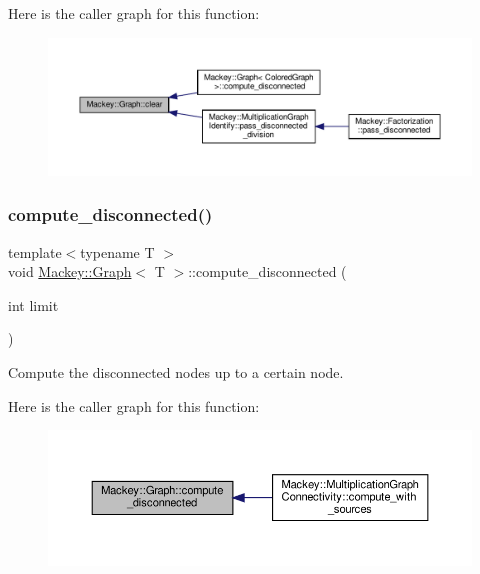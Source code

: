Here is the caller graph for this function\+:\nopagebreak
\begin{figure}[H]
\begin{center}
\leavevmode
\includegraphics[width=350pt]{classMackey_1_1Graph_a69d21bdddbb76aa562aa9f60a84c4b10_icgraph}
\end{center}
\end{figure}
\mbox{\label{classMackey_1_1Graph_a939a62200b14892ba33a389363cd5f5e}} 
\subsubsection{\texorpdfstring{compute\+\_\+disconnected()}{compute\_disconnected()}\hspace{0.1cm}{\footnotesize\ttfamily [1/2]}}
{\footnotesize\ttfamily template$<$typename T $>$ \\
void \hyperlink{classMackey_1_1Graph}{Mackey\+::\+Graph}$<$ T $>$\+::compute\+\_\+disconnected (\begin{DoxyParamCaption}\item[{int}]{limit }\end{DoxyParamCaption})}



Compute the disconnected nodes up to a certain node. 

Here is the caller graph for this function\+:\nopagebreak
\begin{figure}[H]
\begin{center}
\leavevmode
\includegraphics[width=350pt]{classMackey_1_1Graph_a939a62200b14892ba33a389363cd5f5e_icgraph}
\end{center}
\end{figure}
\mbox{\label{classMackey_1_1Graph_ab4042a555abac8c9c2009f07fbdbb4d5}} 
